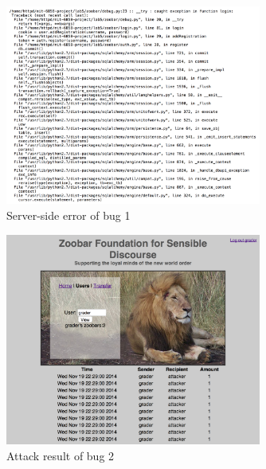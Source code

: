 \documentclass{llncs}
\begin{document}
\begin{figure}
  \begin{center}
    \includegraphics[width=0.75\textwidth]{bug1s.png}
  \end{center}
  \caption{Server-side error of bug 1}
  \label{fig:bug1s}
\end{figure}

\begin{figure}
  \begin{center}
    \includegraphics[width=0.75\textwidth]{bug2.png}
  \end{center}
  \caption{Attack result of bug 2}
  \label{fig:bug2}
\end{figure}
\end{document}
